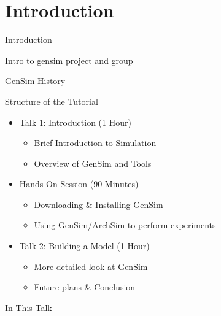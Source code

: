 
\section{Introduction}

\begin{frame}[t]{Introduction}

Intro to gensim project and group

\end{frame}

\begin{frame}{GenSim History}


\end{frame}

\begin{frame}{Structure of the Tutorial}

\begin{itemize}
\item Talk 1: Introduction (1 Hour)
\begin{itemize}
	\item Brief Introduction to Simulation
	\item Overview of GenSim and Tools
\end{itemize}

\item Hands-On Session (90 Minutes)
\begin{itemize}
	\item Downloading \& Installing GenSim
	\item Using GenSim/ArchSim to perform experiments
\end{itemize}

\item Talk 2: Building a Model (1 Hour)
\begin{itemize}
	\item More detailed look at GenSim
	\item Future plans \& Conclusion
\end{itemize}

\end{itemize}

\end{frame}

\begin{frame}{In This Talk}
	\tableofcontents
\end{frame}	
